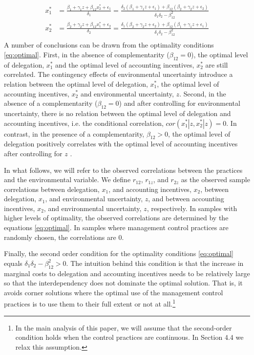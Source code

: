 \documentclass[12pt]{article}
\begin{document}
\begin{equation}\label{eq:optimal}
\begin{aligned}
x_1^* &= \frac{\beta_{1} + \gamma_1 z + \beta_{12} x_2^*  + \epsilon_{1}}{\delta_1 }
		      = \frac{\delta_2 (\beta_{1} + \gamma_1 z + \epsilon_1) 
           					+ \beta_{12} (\beta_{2} + \gamma_2 z + \epsilon_2) }
                            {\delta_1 \delta_2 - \beta_{12}^2} \\
 x_2^* &= \frac{\beta_{2} + \gamma_2 z + \beta_{12} x_1^* + \epsilon_{2}}{\delta_2  }
		      =  \frac{\delta_1 (\beta_{2} + \gamma_2 z + \epsilon_2) 
           					+ \beta_{12} (\beta_{1} + \gamma_1 z + \epsilon_1) }
                            {\delta_1 \delta_2 - \beta_{12}^2} \\
\end{aligned}
\end{equation}
A number of conclusions can be drawn from the optimality conditions \eqref{eq:optimal}. First, in the absence of complementarity ($\beta_{12}=0$), the optimal level of delegation, $x^*_1$ and the optimal level of accounting incentives, $x^*_2$ are still correlated. The contingency effects of environmental uncertainty introduce a relation between the optimal level of delegation, $x^*_1$, the optimal level of accounting incentives, $x^*_2$ and environmental uncertainty, $z$. Second, in the absence of a complementarity ($\beta_{12} = 0$) and after controlling for environmental uncertainty, there is no relation between the optimal level of delegation and accounting incentives, i.e. the conditional correlation, $cor(x^*_1 | z, x^*_2 |z) = 0$.  In contrast, in the presence of a complementarity, $\beta_{12} > 0$, the optimal level of delegation positively correlates with the optimal level of accounting incentives after controlling for $z$ \citep{arora_testing_1996}. 

In what follows, we will refer to the observed correlations between the practices and the environmental variable. We define $r_{12}$, $r_{1z}$, and $r_{2z}$ as the observed sample correlations between delegation, $x_1$, and accounting incentives, $x_2$,  between delegation, $x_1$, and environmental uncertainty, $z$, and between accounting incentives, $x_2$, and environmental uncertainty, $z$, respectively. In samples with higher levels of optimality, the observed correlations are determined by the equations \eqref{eq:optimal}.  In samples where management control practices are randomly chosen, the correlations are $0$. 

Finally, the second order condition for the optimality conditions \eqref{eq:optimal} equals $\delta_1 \delta_2 - \beta_{12}^2 > 0$. The intuition behind this condition is that the increase in marginal costs to delegation and accounting incentives needs to be relatively large so that the interdependency does not dominate the optimal solution. That is, it avoids corner solutions where the optimal use of the management control practices is to use them to their full extent or not at all.\footnote{In the main analysis of this paper, we will assume that the second-order condition holds when the control practices are continuous. In Section 4.4 we relax this assumption.}
\end{document}
